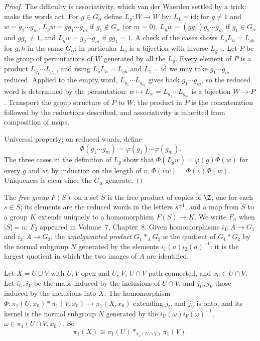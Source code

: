 \begin{proof}
The difficulty is associativity, which van der Waerden settled by a trick: make the words act. For $g\in G_\alpha$ define $L_g\colon W\to W$ by: $L_1=\mathrm{id}$; for $g\ne1$ and $w=g_1\cdots g_m$,
$L_gw=gg_1\cdots g_m$ if $g_1\notin G_\alpha$ (or $m=0$), $L_gw=(gg_1)g_2\cdots g_m$ if $g_1\in G_\alpha$ and $gg_1\ne1$, and $L_gw=g_2\cdots g_m$ if $gg_1=1$. A check of the cases shows $L_gL_h=L_{gh}$ for
$g,h$ in the same $G_\alpha$; in particular $L_g$ is a bijection with inverse $L_{g^{-1}}$. Let $P$ be the group of permutations of $W$ generated by all the $L_g$. Every element of $P$ is a product
$L_{g_1}\cdots L_{g_m}$, and using $L_gL_h=L_{gh}$ and $L_1=\mathrm{id}$ we may take $g_1\cdots g_m$ reduced. Applied to the empty word, $L_{g_1}\cdots L_{g_m}$ gives back $g_1\cdots g_m$, so the
reduced word is determined by the permutation: $w\mapsto L_w=L_{g_1}\cdots L_{g_m}$ is a bijection $W\to P$. Transport the group structure of $P$ to $W$; the product in $P$ is the concatenation
followed by the reductions described, and associativity is inherited from composition of maps.

Universal property: on reduced words, define
\[\Phi(g_1\cdots g_m)=\varphi(g_1)\cdots\varphi(g_m).\] The three cases in the definition of $L_g$ show that $\Phi(L_gw)=\varphi(g)\Phi(w)$ for every $g$ and $w$; by
induction on the length of $v$, $\Phi(vw)=\Phi(v)\Phi(w)$. Uniqueness is clear since the $G_\alpha$ generate.
\end{proof}

The \emph{free group} $F(S)$ on a set $S$ is the free product of copies of $\Z$, one for each $s\in S$; its elements are the reduced words in the letters $s^{\pm1}$, and a map from $S$ to a
group $K$ extends uniquely to a homomorphism $F(S)\to K$. We write $F_n$ when $|S|=n$; $F_2$ appeared in Volume~7, Chapter~8. Given homomorphisms $i_1\colon A\to G_1$ and $i_2\colon A\to G_2$, the
\emph{amalgamated product} $G_1\ast_AG_2$ is the quotient of $G_1\ast G_2$ by the normal subgroup $N$ generated by the elements $i_1(a)i_2(a)^{-1}$: it is the largest quotient in which the
two images of $A$ are identified.

\begin{theorem}\label{thm:vankampen}
Let $X=U\cup V$ with $U,V$ open and $U$, $V$, $U\cap V$ path-connected, and $x_0\in U\cap V$. Let $i_U,i_V$ be the maps induced by the inclusions of $U\cap V$, and $j_U,j_V$ those induced by the
inclusions into $X$. The homomorphism $\Phi\colon\pi_1(U,x_0)\ast\pi_1(V,x_0)\to\pi_1(X,x_0)$ extending $j_U$ and $j_V$ is onto, and its kernel is the normal subgroup $N$ generated by the
$i_U(\omega)i_V(\omega)^{-1}$, $\omega\in\pi_1(U\cap V,x_0)$. So
\[\pi_1(X)\cong\pi_1(U)\ast_{\pi_1(U\cap V)}\pi_1(V).\]
\end{theorem}

